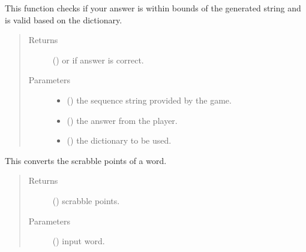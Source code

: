 \documentclass[letterpaper,10pt,english,openany,oneside]{sphinxmanual}
\begin{document}
\begin{fulllineitems}
\label{\detokenize{index:combine.check_answer}}
This function checks if your answer is within bounds of the
generated string and is valid based on the dictionary.
\begin{quote}\begin{description}
\item[{Returns}] \leavevmode
()  or  if answer is correct.

\item[{Parameters}] \leavevmode\begin{itemize}
\item {} 
 () \textendash{} the sequence string provided by the game.

\item {} 
 () \textendash{} the answer from the player.

\item {} 
 () \textendash{} the dictionary to be used.

\end{itemize}

\end{description}\end{quote}

\end{fulllineitems}


\begin{fulllineitems}
\label{\detokenize{index:combine.convert_points}}
This converts the scrabble points of a word.
\begin{quote}\begin{description}
\item[{Returns}] \leavevmode
() scrabble points.

\item[{Parameters}] \leavevmode
{} () \textendash{} input word.

\end{description}\end{quote}

\end{fulllineitems}
\end{document}
